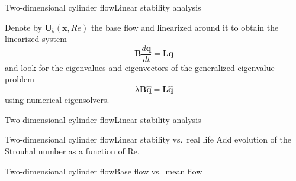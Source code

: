 \documentclass[usenames,dvipsnames,svgnames,10pt,aspectratio=169]{beamer}
\begin{document}
\begin{frame}[t, c]{Two-dimensional cylinder flow}{Linear stability analysis}
  \begin{minipage}{.58\textwidth}
    Denote by $\bm{U}_b(\bm{x}, Re)$ the base flow and linearized around it to obtain the linearized system
    \[
    \bm{B} \dfrac{d\bm{q}}{dt} = \bm{Lq}
    \]
    and look for the eigenvalues and eigenvectors of the generalized eigenvalue problem
    \[
    \lambda \bm{B} \hat{\bm{q}} = \bm{L} \hat{\bm{q}}
    \]
    using numerical eigensolvers.
  \end{minipage}%
  \hfill
  \begin{minipage}{.48\textwidth}
  \end{minipage}
\end{frame}




\begin{frame}[t, c]{Two-dimensional cylinder flow}{Linear stability analysis}
  \begin{minipage}{.48\textwidth}
  \end{minipage}%
  \hfill
  \begin{minipage}{.48\textwidth}
  \end{minipage}
\end{frame}




\begin{frame}[t, c]{Two-dimensional cylinder flow}{Linear stability vs.\ real life}
  \centering
  Add evolution of the Strouhal number as a function of Re.
\end{frame}




\begin{frame}[t, c]{Two-dimensional cylinder flow}{Base flow vs.\ mean flow}
  \begin{minipage}{.48\textwidth}
    \centering
  \end{minipage}%
  \hfill
  \begin{minipage}{.48\textwidth}
    \centering
  \end{minipage}

  \medskip

  \begin{minipage}{.48\textwidth}
  \end{minipage}%
  \hfill
  \begin{minipage}{.48\textwidth}
  \end{minipage}

\end{frame}
\end{document}
